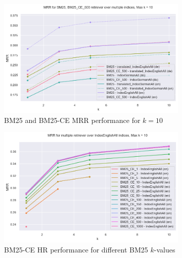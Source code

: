 \begin{figure}[h]
    \centering
    \begin{subfigure}{.5\textwidth}
        \centering
        \includegraphics[width=\linewidth]{Grafiken/Evaluation/Data_Generation/BM25_vs_BM25_CE_MRR.png}
        \captionsetup{width=.9\linewidth}
        \caption{BM25 and BM25-CE MRR performance for $k = 10$}
        \label{fig:retriever-performance-bm25-vs-bm25-ce-mrr}
    \end{subfigure}%
    \begin{subfigure}{.5\textwidth}
        \centering
        \includegraphics[width=\linewidth]{Grafiken/Evaluation/Data_Generation/BM25_CE_k.png}
        \captionsetup{width=.9\linewidth}
        \caption{BM25-CE HR performance for different BM25 $k$-values}
        \label{fig:retriever-performance-bm25-ce-k}
    \end{subfigure}
    \begin{subfigure}{.5\textwidth}
        \centering

\end{subfigure}
\end{figure}
